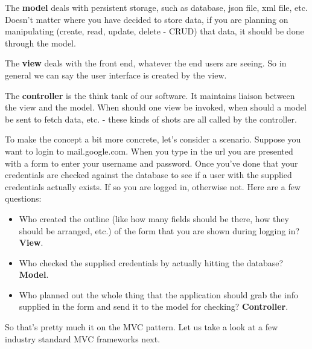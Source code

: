 \documentclass{article}
\begin{document}
The \textbf{model} deals with persistent storage, such as database, json file, xml file, etc.
Doesn't matter where you have decided to store data, 
if you are planning on manipulating (create, read, update, delete - CRUD) that data, 
it should be done through the model.

The \textbf{view} deals with the front end, whatever the end users are seeing. 
So in general we can say the user interface is created by the view.

The \textbf{controller} is the think tank of our software. It maintains liaison between the view and the model.
When should one view be invoked, when should a model be sent to fetch data, etc. - these kinds of shots are all called by the controller.

To make the concept a bit more concrete, let's consider a scenario.
Suppose you want to login to mail.google.com.
When you type in the url you are presented with a form to enter your username and password.
Once you've done that your credentials are checked against the database to see if a user with the supplied credentials actually exists.
If so you are logged in, otherwise not.
Here are a few questions:
\begin{itemize}
	\item Who created the outline (like how many fields should be there, how they should be arranged, etc.) 
		of the form that you are shown during logging in? \textbf{View}.
	\item Who checked the supplied credentials by actually hitting the database? \textbf{Model}.
	\item Who planned out the whole thing that the application should grab the info supplied in the form and send it to the model
		for checking? \textbf{Controller}.
\end{itemize}

So that's pretty much it on the MVC pattern. Let us take a look at a few industry standard MVC frameworks next.
\end{document}
